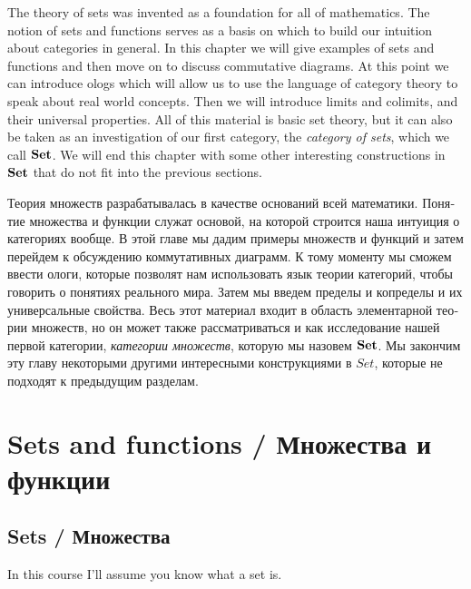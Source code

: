 \documentclass[a4paper]{book}
\def\Set{{\bf Set}}
\theoremstyle{myth}
\begin{document}
\begin{russian}
The theory of sets was invented as a foundation for all of mathematics. The notion of sets and functions serves as a basis on which to build our intuition about categories in general. In this chapter we will give examples of sets and functions and then move on to discuss commutative diagrams. At this point we can introduce ologs which will allow us to use the language of category theory to speak about real world concepts. Then we will introduce limits and colimits, and their universal properties. All of this material is basic set theory, but it can also be taken as an investigation of our first category, the {\em category of sets}, which we call $\Set$. We will end this chapter with some other interesting constructions in $\Set$ that do not fit into the previous sections.

Теория множеств разрабатывалась в качестве оснований всей математики. Понятие множества и функции служат основой, на которой строится наша интуиция о категориях вообще. В этой главе мы дадим примеры множеств и функций и затем перейдем к обсуждению коммутативных диаграмм. К тому моменту мы сможем ввести ологи, которые позволят нам использовать язык теории категорий, чтобы говорить о понятиях реального мира. Затем мы введем пределы и копределы и их универсальные свойства. Весь этот материал входит в область элементарной теории множеств, но он может также рассматриваться и как исследование нашей первой категории, {\em категории множеств}, которую мы назовем $\Set$. Мы закончим эту главу некоторыми другими интересными конструкциями в $Set$, которые не подходят к предыдущим разделам.%


\section{Sets and functions / Множества и функции}


\subsection{Sets / Множества}

In this course I'll assume you know what a set is.%
\end{russian}
\end{document}

